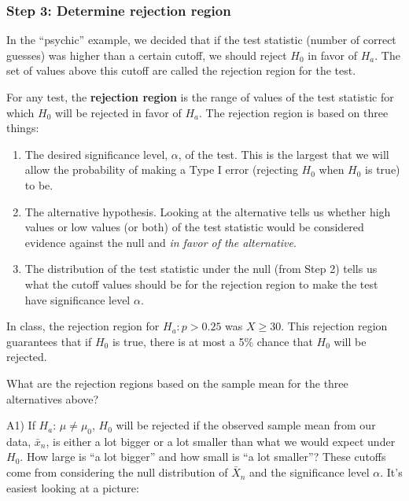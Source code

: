 \documentclass[]{article}
\begin{document}
\hypertarget{step-3-determine-rejection-region}{%
\subsubsection{Step 3: Determine rejection
region}\label{step-3-determine-rejection-region}}

In the ``psychic'' example, we decided that if the test statistic
(number of correct guesses) was higher than a certain cutoff, we should
reject \(H_0\) in favor of \(H_a\). The set of values above this cutoff
are called the rejection region for the test.

For any test, the \textbf{rejection region} is the range of values of
the test statistic for which \(H_0\) will be rejected in favor of
\(H_a\). The rejection region is based on three things:

\begin{enumerate}
\def\labelenumi{\arabic{enumi})}
\item
  The desired significance level, \(\alpha\), of the test. This is the
  largest that we will allow the probability of making a Type I error
  (rejecting \(H_0\) when \(H_0\) is true) to be.
\item
  The alternative hypothesis. Looking at the alternative tells us
  whether high values or low values (or both) of the test statistic
  would be considered evidence against the null and \emph{in favor of
  the alternative}.
\item
  The distribution of the test statistic under the null (from Step 2)
  tells us what the cutoff values should be for the rejection region to
  make the test have significance level \(\alpha\).
\end{enumerate}

In class, the rejection region for \(H_a: p > 0.25\) was \(X \geq 30\).
This rejection region guarantees that if \(H_0\) is true, there is at
most a 5\% chance that \(H_0\) will be rejected.

What are the rejection regions based on the sample mean for the three
alternatives above?

A1) If \(H_{a}\): \(\mu \neq \mu_0\), \(H_0\) will be rejected if the
observed sample mean from our data, \(\bar x_n\), is either a lot bigger
or a lot smaller than what we would expect under \(H_0\). How large is
``a lot bigger'' and how small is ``a lot smaller''? These cutoffs come
from considering the null distribution of \(\bar X_n\) and the
significance level \(\alpha\). It's easiest looking at a picture:
\end{document}
